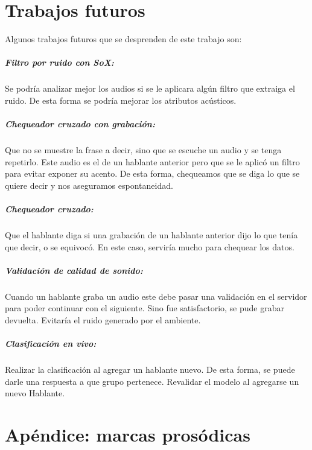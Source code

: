 \documentclass[11pt,a4paper,twoside]{tesis}
\begin{document}
\chapter{Trabajos futuros}

Algunos trabajos futuros que se desprenden de este trabajo son:

\paragraph*{Filtro por ruido con SoX:} Se podría analizar mejor los audios si se le aplicara algún filtro que extraiga el ruido. De esta forma se podría mejorar los atributos acústicos. 

\paragraph*{Chequeador cruzado con grabación:} Que no se muestre la frase a decir, sino que se escuche un audio y se tenga repetirlo. Este audio es el de un hablante anterior pero que se le aplicó un filtro para evitar exponer su acento. De esta forma, chequeamos que se diga lo que se quiere decir y nos aseguramos espontaneidad.

\paragraph*{Chequeador cruzado:} Que el hablante diga si una grabación de un hablante anterior dijo lo que tenía que decir, o se equivocó. En este caso, serviría mucho para chequear los datos. 

\paragraph*{Validación de calidad de sonido:} Cuando un hablante graba un audio este debe pasar una validación en el servidor para poder continuar con el siguiente. Sino fue satisfactorio, se pude grabar devuelta. Evitaría el ruido generado por el ambiente. 

\paragraph*{Clasificación en vivo:} Realizar la clasificación al agregar un hablante nuevo. De esta forma, se puede darle una respuesta a que grupo pertenece. Revalidar el modelo al agregarse un nuevo Hablante. 

\chapter{Apéndice: marcas prosódicas}
\end{document}
